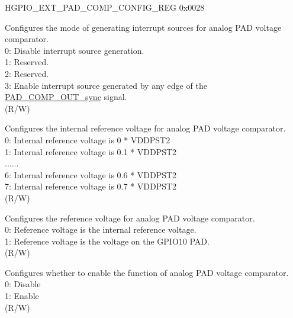 \begin{register}{H}{GPIO\_EXT\_PAD\_COMP\_CONFIG\_REG }{0x0028}\label{regdesc:GPIOSDPADCOMPCONFIGREG}
%
%
%
%
%
\regnewline%
\begin{regdesc}\begin{reglist}
\label{fielddesc:GPIOSDZERODETMODE}\item [GPIO\_EXT\_ZERO\_DET\_MODE] Configures the mode of generating interrupt sources for analog PAD voltage comparator.\\
0: Disable interrupt source generation.\\
1: Reserved.\\
2: Reserved.\\
3: Enable interrupt source generated by any edge of the \hyperref[sec:zcd_pads]{PAD\_COMP\_OUT\_sync} signal.\\(R/W)

\label{fielddesc:GPIOSDDREFCOMP}\item [GPIO\_EXT\_DREF\_COMP] Configures the internal reference voltage for analog PAD voltage comparator. \\
0: Internal reference voltage is 0 * VDDPST2\\
1: Internal reference voltage is 0.1 * VDDPST2\\
......\\
6: Internal reference voltage is 0.6 * VDDPST2\\
7: Internal reference voltage is 0.7 * VDDPST2\\(R/W)

\label{fielddesc:GPIOSDMODECOMP}\item [GPIO\_EXT\_MODE\_COMP] Configures the reference voltage for analog PAD voltage comparator.\\
0: Reference voltage is the internal reference voltage.\\
1: Reference voltage is the voltage on the GPIO10 PAD. \\(R/W)

\label{fielddesc:GPIOSDXPDCOMP}\item [GPIO\_EXT\_XPD\_COMP] Configures whether to enable  the function of analog PAD voltage comparator.\\
0: Disable\\
1: Enable \\(R/W)
\end{reglist}\end{regdesc}
\end{register}

